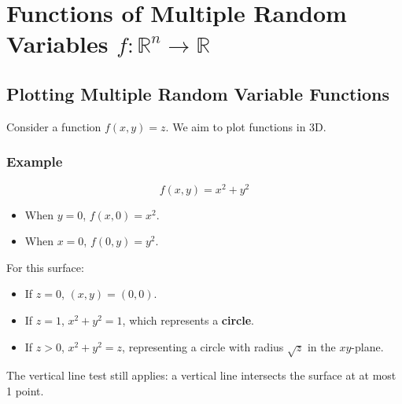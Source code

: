\documentclass{report}
\begin{document}
\chapter{Functions of Multiple Random Variables $f:\mathbb{R} ^ n \rightarrow \mathbb{R}$}

\section{Plotting Multiple Random Variable Functions}

Consider a function $f(x, y) = z$. We aim to plot functions in 3D.

\subsection*{Example}
\[
	f(x, y) = x^2 + y^2
\]

\begin{itemize}
	\item When $y = 0$, $f(x, 0) = x^2$.
	\item When $x = 0$, $f(0, y) = y^2$.
\end{itemize}

\begin{center}
\end{center}

For this surface:
\begin{itemize}
	\item If $z = 0$, $(x, y) = (0, 0)$.
	\item If $z = 1$, $x^2 + y^2 = 1$, which represents a \textbf{circle}.
	\item If $z > 0$, $x^2 + y^2 = z$, representing a circle with radius $\sqrt{z}$ in the $xy$-plane.
\end{itemize}

The vertical line test still applies: a vertical line intersects the surface at at most 1 point.

\begin{center}
\end{center}
\end{document}
